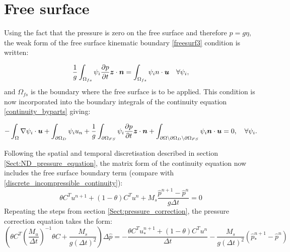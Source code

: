 \section{Free surface}

Using the fact that the pressure is zero on the free surface and therefore $p=g\eta$, the weak form of the free surface kinematic boundary \eqref{freesurf3} condition is written:

\begin{equation}\label{weakfreesurf3}
\frac{1}{g} \int_{\Omega_{fs}} {\psi_i }\frac{\partial p}{\partial t}{\mbox{\boldmath$z$}} \cdot {\mbox{\boldmath$n$}}=\int_{\Omega_{fs}} \psi_i {n \cdot {\mbox{\boldmath$u$}}} \quad
  \forall \psi_i,
\end{equation}
and $\Omega_{fs}$ is the boundary where the free surface is to be applied. This condition is now incorporated into the boundary integrals of the continuity equation \eqref{continuity_byparts} giving:

\begin{equation}\label{continuity_byparts_withfs}
  -\int_\Omega \nabla\psi_i \cdot {\mbox{\boldmath$u$}}
  + \int_{\partial\Omega_D} \psi_i u_n
  + \frac{1}{g} \int_{\partial\Omega_{FS}}  {\psi_i }\frac{\partial p}{\partial t}{\mbox{\boldmath$z$}} \cdot {\mbox{\boldmath$n$}}
  + \int_{\partial\Omega\setminus\partial\Omega_D\setminus\partial\Omega_{FS}} \psi_i{\mbox{\boldmath$n$}}\cdot {\mbox{\boldmath$u$}}
  = 0,\quad
  \forall \psi_i.
\end{equation}

Following the spatial and temporal discretisation described in section \ref{Sect:ND_pressure_equation}, 
the matrix form of the continuity equation now includes the free surface boundary term (compare with 
\eqref{discrete_incompressible_continuity}):
\begin{equation}
\theta C^T u^{n+1} + (1-\theta) C^T u^n + M_s \frac{\hat p^{n+1}-\hat p^n}{g \Delta t}=0
\end{equation}
Repeating the steps from section \ref{Sect:pressure_correction}, the pressure correction equation takes the form:
\begin{equation}
\left(\theta C^T(\frac{M_u}{\Delta t})^{-1} \theta C + \frac{M_s}{g(\Delta t)^2}\right)\Delta \hat p = -\frac{\theta C^T u_*^{n+1} + (1-\theta)C^Tu^n}{\Delta t}-\frac{M_s}{g(\Delta t)^2}(\hat p_*^{n+1}-\hat p^n)
\end{equation}

